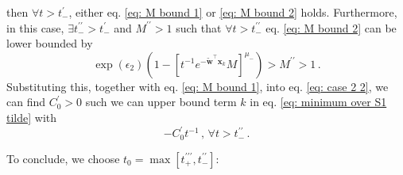 \documentclass[twoside,11pt,english]{article}
\begin{document}
\begin{enumerate}
then $\forall t>t_{-}^{\prime}$, either eq. \ref{eq: M bound 1}
or \ref{eq: M bound 2} holds. Furthermore, in this case, $\exists t_{-}^{\prime\prime}>t_{-}^{\prime}$
and $M^{\prime\prime}>1$ such that $\forall t>t_{-}^{\prime\prime}$
eq. \ref{eq: M bound 2} can be lower bounded by 
\[
\exp\left(\epsilon_{2}\right)\left(1-\left[t^{-1}e^{-\tilde{\mathbf{w}}^{\top}\mathbf{x}_{k}}M\right]^{\mu_{-}}\right)>M^{\prime\prime}>1\,.
\]
Substituting this, together with eq. \ref{eq: M bound 1}, into eq.
\ref{eq: case 2 2}, we can find $C_{0}^{\prime}>0$ such we can upper
bound term $k$ in eq. \ref{eq: minimum over S1 tilde} with 
\begin{equation}
-C_{0}^{\prime}t^{-1}\,,\,\forall t>t_{-}^{\prime\prime}\,.\label{eq: negative case c}
\end{equation}
\end{enumerate}
To conclude, we choose $t_{0}=\max\left[t_{+}^{\prime\prime\prime},t_{-}^{\prime\prime}\right]$: 
\end{document}
